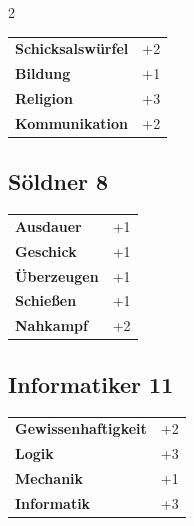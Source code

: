 \begin{multicols}{2}
\begin{tcolorbox}
\vspace{3mm}

\begin{tabular}{@{}ll@{}}
    \textbf{Schicksalswürfel} & +2\\
    \textbf{Bildung} & +1\\
    \textbf{Religion} & +3\\
    \textbf{Kommunikation} & +2\\
\end{tabular}


\end{tcolorbox}

\begin{tcolorbox}
    \subsection*{Söldner \hfill \small{8 }}
    \tcblower




\begin{tabular}{@{}ll@{}}
    \textbf{Ausdauer} & +1\\
    \textbf{Geschick} & +1\\
    \textbf{Überzeugen} & +1\\
    \textbf{Schießen} & +1\\
    \textbf{Nahkampf} & +2\\
\end{tabular}


\end{tcolorbox}

\begin{tcolorbox}
    \subsection*{Informatiker \hfill \small{11 }}
    \tcblower




\begin{tabular}{@{}ll@{}}
    \textbf{Gewissenhaftigkeit} & +2\\
    \textbf{Logik} & +3\\
    \textbf{Mechanik} & +1\\
    \textbf{Informatik} & +3\\
\end{tabular}


\end{tcolorbox}
\end{multicols}
